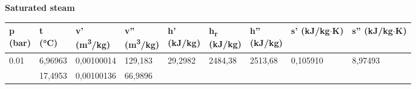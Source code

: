\documentclass[a4paper]{article}
\begin{document}
\begin{center}
    \textbf{ Saturated steam }
\end{center}
\vspace{0.2cm} %

\begin{longtable}{|>{\raggedleft\arraybackslash}p{1.2cm}|>{\raggedleft\arraybackslash}p{1.5cm}|>{\raggedleft\arraybackslash}p{1.8cm}|>{\raggedleft\arraybackslash}p{1.8cm}|>{\raggedleft\arraybackslash}p{1.5cm}|
>{\raggedleft\arraybackslash}p{1.5cm}|>{\raggedleft\arraybackslash}p{1.5cm}|>{\raggedleft\arraybackslash}p{1.5cm}|>{\raggedleft\arraybackslash}p{1.5cm}|}
\hline
\small \makecell{\textbf{p} \\ (bar)} & \small \makecell{\textbf{t} \\ (°C)} 
& \small \makecell{\textbf{v'} \\ (m\textsuperscript{3}/kg)} & \small \makecell{\textbf{v''} \\ (m\textsuperscript{3}/kg)} 
& \small \makecell{\textbf{h'} \\ (kJ/kg)} & \small \makecell{\textbf{h\textsubscript{r}} \\ (kJ/kg)} & \small \makecell{\textbf{h''} \\ (kJ/kg)} 
& \small \makecell{\textbf{s'} \\ (kJ/kg$\cdot$K)} & \small \makecell{\textbf{s''} \\ (kJ/kg$\cdot$K)} \\
\hline
\endfirsthead

\hline
\hline
\endhead

\hline
\endfoot

\hline
\endlastfoot



0.01 & 

6,96963 & 

0,00100014 & 

129,183 & 

29,2982 & 

2484,38 & 

2513,68 & 

0,105910 & 

8,97493
 \\


0.02 & 

17,4953 & 

0,00100136 & 

66,9896 & 


\end{longtable}
\end{document}
